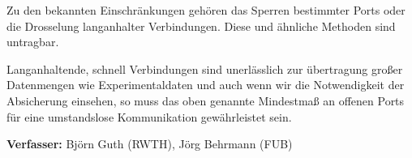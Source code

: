 \documentclass[12pt,oneside]{scrartcl}
\begin{document}
Zu den bekannten Einschränkungen gehören das Sperren bestimmter Ports oder die
Drosselung langanhalter Verbindungen. Diese und ähnliche Methoden sind
untragbar.

Langanhaltende, schnell Verbindungen sind unerlässlich zur übertragung großer
Datenmengen wie Experimentaldaten und auch wenn wir die Notwendigkeit der
Absicherung einsehen, so muss das oben genannte Mindestmaß an offenen Ports für
eine umstandslose Kommunikation gewährleistet sein.

\vspace{1cm}
\textbf{Verfasser:} Björn Guth (RWTH), Jörg Behrmann (FUB)
\end{document}
